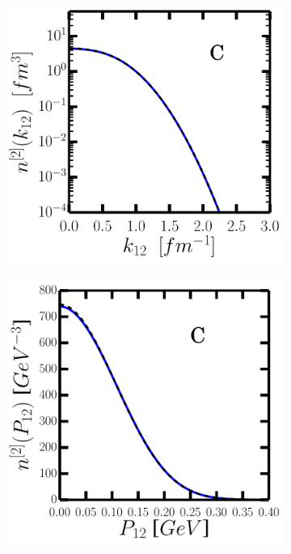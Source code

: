\documentclass[11pt,twoside]{book}
\begin{document}
\begin{figure}
\centering
\begin{subfigure}{0.49\textwidth}
\includegraphics[width=\textwidth]{./figuren/C_tb_rel.pdf}
\end{subfigure}
\begin{subfigure}{0.49\textwidth}
\includegraphics[width=\textwidth]{./figuren/C_tb_cm.pdf}

\end{subfigure}
\end{figure}
\end{document}
